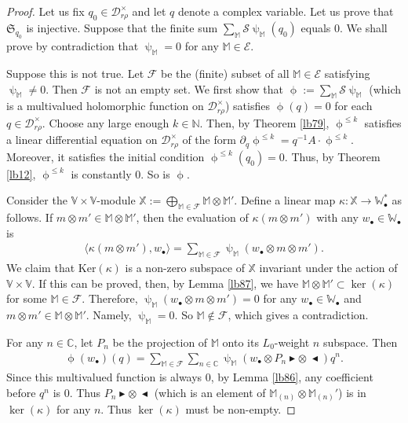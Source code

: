 \documentclass[12pt,a4paper,notitlepage]{report}
\theoremstyle{definition}
\theoremstyle{plain}
\newcommand{\fk}{\mathfrak}
\newcommand{\mc}{\mathcal}
\newcommand{\bk}[1]{\langle {#1}\rangle}
\newcommand{\mbb}{\mathbb}
\newcommand{\blt}{\bullet}
\newcommand{\Vbb}{\mathbb V}
\newcommand{\Wbb}{\mathbb W}
\newcommand{\Mbb}{\mathbb M}
\newcommand{\Cbb}{\mathbb C}
\newcommand{\Nbb}{\mathbb N}
\newcommand{\btl}{\blacktriangleleft}
\newcommand{\btr}{\blacktriangleright}
\newcommand{\Ker}{\mathrm{Ker}}
\numberwithin{equation}{section}
\begin{document}
\begin{proof}
Let us fix $q_0\in\mc D_{r\rho}^\times$ and let $q$ denote a complex variable. Let us prove that $\fk S_{q_0}$ is injective. Suppose that the finite sum $\sum_\Mbb\mc S\uppsi_\Mbb(q_0)$ equals $0$. We shall prove by contradiction that $\uppsi_\Mbb=0$ for any $\Mbb\in\mc E$. 

Suppose this is not true. Let $\mc F$ be the (finite) subset of all $\Mbb\in\mc E$ satisfying $\uppsi_\Mbb\neq0$. Then $\mc F$ is not an empty set. We first show that $\upphi:=\sum_\Mbb\mc S\uppsi_\Mbb$ (which is a multivalued holomorphic function on $\mc D_{r\rho}^\times$) satisfies $\upphi(q)=0$ for each $q\in\mc D_{r\rho}^\times$. Choose any large enough  $k\in\Nbb$. Then, by Theorem \ref{lb79},  $\upphi^{\leq k}$ satisfies a linear differential equation on $\mc D_{r\rho}^\times$ of the form $\partial_q\upphi^{\leq k}=q^{-1}A\cdot \upphi^{\leq k}$. Moreover, it satisfies the initial condition $\upphi^{\leq k}(q_0)=0$. Thus, by Theorem \ref{lb12}, $\upphi^{\leq k}$ is constantly $0$. So is $\upphi$.

Consider the $\Vbb\times\Vbb$-module $\mbb X:=\bigoplus_{\Mbb\in\mc F}\Mbb\otimes\Mbb'$. Define a linear map $\kappa:\mbb X\rightarrow \Wbb_\blt^*$ as follows. If $m\otimes m'\in\Mbb\otimes\Mbb'$, then the evaluation of $\kappa(m\otimes m')$ with any $w_\blt\in\Wbb_\blt$ is
\begin{align*}
\bk{\kappa(m\otimes m'),w_\blt}=\sum_{\Mbb\in\mc F}\uppsi_\Mbb(w_\blt\otimes m\otimes m').
\end{align*}
We claim that $\Ker(\kappa)$ is a non-zero subspace of $\mbb X$ invariant under the action of $\Vbb\times \Vbb$. If this can be proved, then, by Lemma \ref{lb87}, we have $\Mbb\otimes\Mbb'\subset \ker(\kappa)$ for some $\Mbb\in\mc F$. Therefore, $\uppsi_\Mbb(w_\blt\otimes m\otimes m')=0$ for any $w_\blt\in\Wbb_\blt$ and $m\otimes m'\in\Mbb\otimes\Mbb'$. Namely, $\uppsi_\Mbb=0$. So $\Mbb\notin\mc F$, which gives a contradiction. 

For any $n\in\Cbb$, let $P_n$ be the projection of $\Mbb$ onto its $L_0$-weight $n$ subspace. Then 
\begin{align*}
\upphi(w_\blt)(q)=\sum_{\Mbb\in\mc F}\sum_{n\in\Cbb} \uppsi_\Mbb(w_\blt\otimes P_n\btr\otimes~\btl)q^n.
\end{align*}
Since this multivalued function is always $0$, by Lemma \ref{lb86}, any coefficient before $q^n$ is $0$. Thus $P_n\btr\otimes~\btl$ (which is an element of $\Mbb_{(n)}\otimes\Mbb_{(n)}'$) is in $\ker(\kappa)$ for any $n$. Thus $\ker(\kappa)$ must be non-empty.


\end{proof}
\end{document}
